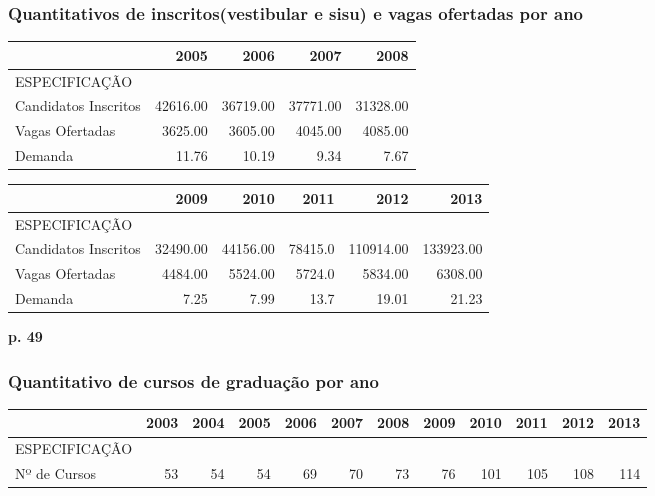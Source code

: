 \documentclass{article}
\begin{document}
\subsubsection{Quantitativos de inscritos(vestibular e sisu) e vagas ofertadas por ano}
\begin{tabular}{lrrrr}
\toprule
{} &      2005 &      2006 &      2007 &      2008 \\
\midrule
ESPECIFICAÇÃO        &           &           &           &           \\
Candidatos Inscritos &  42616.00 &  36719.00 &  37771.00 &  31328.00 \\
Vagas Ofertadas      &  3625.00 &  3605.00 &  4045.00 &  4085.00 \\
Demanda              &  11.76 &  10.19 &  9.34 &  7.67 \\
\bottomrule
\end{tabular}

\begin{tabular}{lrrrrr}
\toprule
{} &      2009 &      2010 &     2011 &       2012 &       2013 \\
\midrule
ESPECIFICAÇÃO        &           &           &          &            &            \\
Candidatos Inscritos &  32490.00 &  44156.00 &  78415.0 &  110914.00 &  133923.00 \\
Vagas Ofertadas      &  4484.00 &  5524.00 &  5724.0 &  5834.00 &  6308.00 \\
Demanda              &  7.25 &  7.99 &  13.7 &  19.01 &  21.23 \\
\bottomrule
\end{tabular}

\textbf{p. 49}

\subsubsection{Quantitativo de cursos de graduação por ano}
\begin{tabular}{lrrrrrrrrrrr}
\toprule
{} &  2003 &  2004 &  2005 &  2006 &  2007 &  2008 &  2009 &  2010 &  2011 &  2012 &  2013 \\
\midrule
ESPECIFICAÇÃO &       &       &       &       &       &       &       &       &       &       &       \\
Nº de Cursos  &  53 &  54 &  54 &  69 &  70 &  73 &  76 &  101 &  105 &  108 &  114 \\
\bottomrule
\end{tabular}
\end{document}
